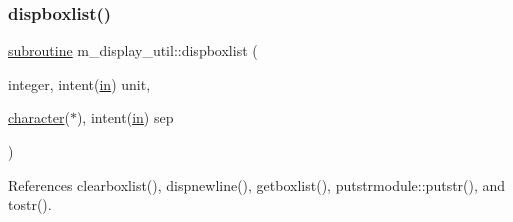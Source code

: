 \subsubsection{\texorpdfstring{dispboxlist()}{dispboxlist()}}
{\footnotesize\ttfamily \hyperlink{M__stopwatch_83_8txt_acfbcff50169d691ff02d4a123ed70482}{subroutine} m\+\_\+display\+\_\+util\+::dispboxlist (\begin{DoxyParamCaption}\item[{integer, intent(\hyperlink{M__journal_83_8txt_afce72651d1eed785a2132bee863b2f38}{in})}]{unit,  }\item[{\hyperlink{option__stopwatch_83_8txt_abd4b21fbbd175834027b5224bfe97e66}{character}($\ast$), intent(\hyperlink{M__journal_83_8txt_afce72651d1eed785a2132bee863b2f38}{in})}]{sep }\end{DoxyParamCaption})\hspace{0.3cm}{\ttfamily [private]}}



References clearboxlist(), dispnewline(), getboxlist(), putstrmodule\+::putstr(), and tostr().

